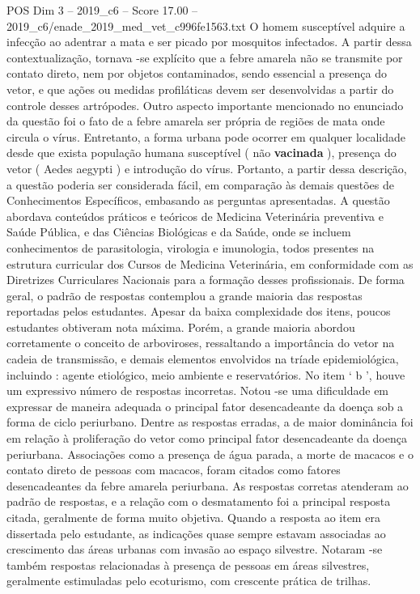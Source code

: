 \begin{textsample}{POS Dim 3 – 2019\_c6 – Score 17.00 – 2019\_c6/enade\_2019\_med\_vet\_c996fe1563.txt}
O homem susceptível adquire a infecção ao adentrar a mata e ser picado por mosquitos infectados.
A partir dessa contextualização, tornava -se explícito que a febre amarela não se transmite por contato direto, nem por objetos contaminados, sendo essencial a presença do vetor, e que ações ou medidas profiláticas devem ser desenvolvidas a partir do controle desses artrópodes.
Outro aspecto importante mencionado no enunciado da questão foi o fato de a febre amarela ser própria de regiões de mata onde circula o vírus.
Entretanto, a forma urbana pode ocorrer em qualquer localidade desde que exista população humana susceptível ( não \textbf{vacinada} ), presença do vetor ( Aedes aegypti ) e introdução do vírus.
Portanto, a partir dessa descrição, a questão poderia ser considerada fácil, em comparação às demais questões de Conhecimentos Específicos, embasando as perguntas apresentadas.
A questão abordava conteúdos práticos e teóricos de Medicina Veterinária preventiva e Saúde Pública, e das Ciências Biológicas e da Saúde, onde se incluem conhecimentos de parasitologia, virologia e imunologia, todos presentes na estrutura curricular dos Cursos de Medicina Veterinária, em conformidade com as Diretrizes Curriculares Nacionais para a formação desses profissionais.
De forma geral, o padrão de respostas contemplou a grande maioria das respostas reportadas pelos estudantes.
Apesar da baixa complexidade dos itens, poucos estudantes obtiveram nota máxima.
Porém, a grande maioria abordou corretamente o conceito de arboviroses, ressaltando a importância do vetor na cadeia de transmissão, e demais elementos envolvidos na tríade epidemiológica, incluindo : agente etiológico, meio ambiente e reservatórios.
No item ‘ b ’, houve um expressivo número de respostas incorretas.
Notou -se uma dificuldade em expressar de maneira adequada o principal fator desencadeante da doença sob a forma de ciclo periurbano.
Dentre as respostas erradas, a de maior dominância foi em relação à proliferação do vetor como principal fator desencadeante da doença periurbana.
Associações como a presença de água parada, a morte de macacos e o contato direto de pessoas com macacos, foram citados como fatores desencadeantes da febre amarela periurbana.
As respostas corretas atenderam ao padrão de respostas, e a relação com o desmatamento foi a principal resposta citada, geralmente de forma muito objetiva.
Quando a resposta ao item era dissertada pelo estudante, as indicações quase sempre estavam associadas ao crescimento das áreas urbanas com invasão ao espaço silvestre.
Notaram -se também respostas relacionadas à presença de pessoas em áreas silvestres, geralmente estimuladas pelo ecoturismo, com crescente prática de trilhas.

\end{textsample}
